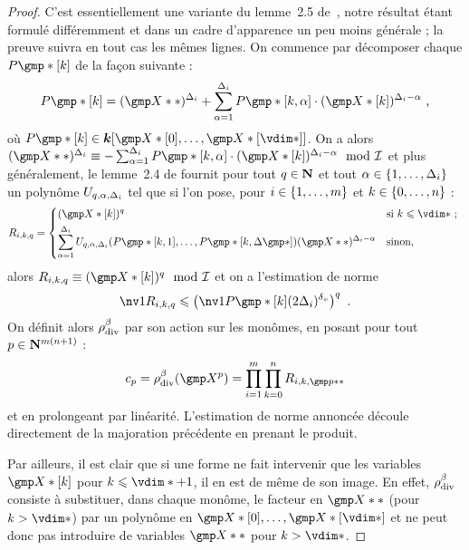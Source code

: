\begin{proof}
  C'est essentiellement une variante du lemme~2.5 de~\cite{remivg}, notre
  résultat étant formulé différemment et dans un cadre d'apparence un peu
  moins générale ; la preuve suivra en tout cas les mêmes lignes. On commence
  par décomposer chaque \( P\mexp*[\ind] \) de la façon suivante :
  \begin{equation}
    P\mexp*[\ind]
    =
    (\vmp**)^{\Delta_\fct}
    +
    \sum _{\alpha=1}^{\Delta_\fct}
    P\mexp*[\ind, \alpha] \cdot (\vmp*[\ind])^{\Delta_\fct - \alpha}
    \pmm,
  \end{equation}
  où \( P\mexp*[\ind] \in \cdn [ \vmp*[0], \dots, \vmp*[\vdim*] ] \).
  On a alors \(
    (\vmp**)^{\Delta_\fct}
    \equiv
    - \sum _{\alpha=1}^{\Delta_\fct}
    P\mexp*[\ind, \alpha] \cdot (\vmp*[\ind])^{\Delta_\fct - \alpha}
    \mod \Ideal \) et plus généralement, le lemme~2.4 de \cite{remivg} fournit
  pour tout \( q \in {\mathbf{N}} \) et tout \( \alpha \in \lbrace1, \dots,
      \Delta_i\rbrace \) un polynôme \( U_{q, \alpha, \Delta_i} \) tel que
  si l'on pose, pour \( i \in \lbrace1, \dots, m\rbrace \) et \(
    k \in \lbrace 0, \dots, n \rbrace \) :
  \begin{equation}
    R_{\fct, \ind, q}
    =
    \begin{dcases*}
      ( \vmp*[\ind] ) ^q
      & si \( \ind \le \vdim* \) ;
      \\
      \sum _{\alpha=1}^{\Delta_\fct}
      U_{q, \alpha, \Delta_\fct}
      ( P\mexp*[\ind, 1], \dots, P\mexp*[\ind, \Delta\mexp*] )
      (\vmp**)^{\Delta_\fct - \alpha}
      & sinon,
    \end{dcases*}
  \end{equation}
  alors \( R_{\fct, \ind, q} \equiv ( \vmp*[\ind] ) ^q \mod \Ideal \) et
  on a l'estimation de norme
  \begin{equation}
    \nv1{ R_{\fct, \ind, q} }
    \le
    \left(
    \nv1{ P\mexp*[\ind] } (2\Delta_\fct)^\dv
    \right) ^q
    \pmm.
  \end{equation}
  On définit alors \( \rho\sb{\mathrm{div }}^\beta \) par son action sur les monômes, en posant
  pour tout \( p \in {\mathbf{N}}^{m(n+1)} \) :
  \begin{equation}
    c_p
    = \rdiv^\beta(\vmp^p)
    = \prod\fctrange \prod\indrange R_{\fct, \ind, \gmp p**}
  \end{equation}
  et en prolongeant par linéarité. L'estimation de norme annoncée découle
  directement de la majoration précédente en prenant le produit.

  Par ailleurs, il est clair que si une forme ne fait intervenir que les
  variables \( \vmp*[\ind] \) pour \( \ind \le \vdim* + 1 \), il en est de
  même de son image. En effet, \( \rho\sb{\mathrm{div }}^\beta \) consiste à substituer, dans
  chaque monôme, le facteur en \( \vmp** \) (pour \( \ind > \vdim* \)) par un
  polynôme en \( \vmp*[0], \dots, \vmp*[\vdim*] \) et ne peut donc pas
  introduire de variables \( \vmp** \) pour \( \ind > \vdim* \).
\end{proof}

